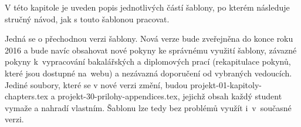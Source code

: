 





\label{jak}

V této kapitole je uveden popis jednotlivých částí šablony, po kterém následuje stručný návod, jak s touto šablonou pracovat. 

Jedná se o přechodnou verzi šablony. Nová verze bude zveřejněna do konce roku 2016 a bude navíc obsahovat nové pokyny ke správnému využití šablony, závazné pokyny k~vypracování bakalářských a diplomových prací (rekapitulace pokynů, které jsou dostupné na~webu) a nezávazná doporučení od vybraných vedoucích. Jediné soubory, které se v nové verzi změní, budou projekt-01-kapitoly-chapters.tex a projekt-30-prilohy-appendices.tex, jejichž obsah každý student vymaže a nahradí vlastním. Šablonu lze tedy bez problémů využít i~v~současné verzi.


